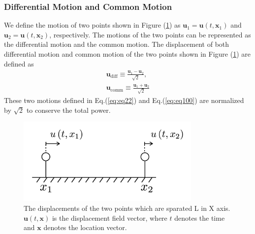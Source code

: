 \subsubsection{Differential Motion and Common Motion}
We define the motion of two points shown in Figure (\ref{img:img310}) as $\bm{u}_1=\bm{u}(t,\bm{x}_1)$ and $\bm{u}_2=\bm{u}(t,\bm{x}_2)$, respectively. The motions of the two points can be represented as the differential motion and the common motion. The displacement of both differential motion and common motion of the two points shown in Figure (\ref{img:img310}) are defined as
\begin{eqnarray}
  \bm{u}_{\mathrm{diff}} \equiv \frac{\bm{u}_{1}-\bm{u}_{2}}{\sqrt{2}}, \, \\ \label{eq:eq22}
  \bm{u}_{\mathrm{comm}}  \equiv \frac{\bm{u}_{1}+\bm{u}_{2}}{\sqrt{2}} \label{eq:eq100}
\end{eqnarray}
These two motions defined in Eq.(\ref{eq:eq22}) and Eq.(\ref{eq:eq100}) are normalized by $\sqrt{2}$ to conserve the total power.
\begin{figure}[h]
  \begin{center}
    \includegraphics[width=9.0cm]{./img_chap3/img315.png}
    \caption{The displacements of the two points which are sparated L in X axis. $\bm{u}(t,\bm{x})$ is the displacement field vector, where $t$ denotes the time and $\bm{x}$ denotes the location vector.}\label{img:img310}    
  \end{center}
\end{figure}



